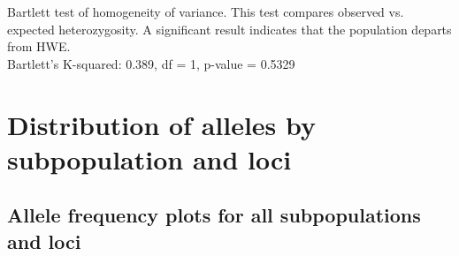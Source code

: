 \documentclass[a4paper]{scrartcl}\usepackage[]{graphicx}\usepackage[]{color}
\begin{document}
\noindent
Bartlett test of homogeneity of variance. This test compares observed vs. expected heterozygosity. A significant result indicates that the population departs from HWE. \\
Bartlett's K-squared: 0.389, df = 1, p-value = 0.5329



\FloatBarrier
\section{Distribution of alleles by subpopulation and loci}
\subsection{Allele frequency plots for all subpopulations and loci}


\FloatBarrier
\end{document}

